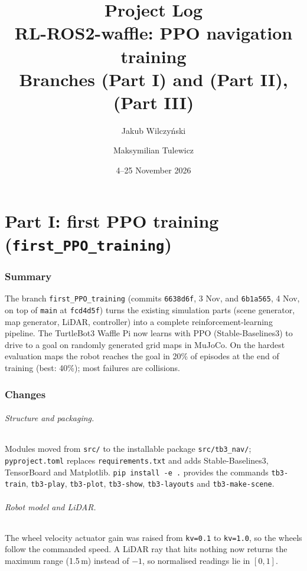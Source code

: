 \documentclass[11pt,a4paper]{article}
\title{\textbf{Project Log}\\[4pt]
\large RL-ROS2-waffle: PPO navigation training\\
\normalsize Branches \code{first\_PPO\_training} (Part I) and
\code{PPO\_evoution\_and\_tweaks} (Part II), \code{main} (Part III)}
\author{Jakub Wilczyński \and Maksymilian Tulewicz}
\date{4--25 November 2026}
\newcommand{\code}[1]{\texttt{#1}}
\begin{document}
\maketitle

\part*{Part I: first PPO training (\code{first\_PPO\_training})}

\section{Summary}
The branch \code{first\_PPO\_training} (commits \code{6638d6f}, 3 Nov, and
\code{6b1a565}, 4 Nov, on top of \code{main} at \code{fcd4d5f}) turns the
existing simulation parts (scene generator, map generator, LiDAR, controller)
into a complete reinforcement-learning pipeline. The TurtleBot3 Waffle Pi now
learns with PPO (Stable-Baselines3) to drive to a goal on randomly generated
grid maps in MuJoCo. On the hardest evaluation maps the robot reaches the goal
in 20\% of episodes at the end of training (best: 40\%); most failures are
collisions.

\section{Changes}

\paragraph{Structure and packaging.} Modules moved from \code{src/} to the installable package \code{src/tb3\_nav/};
\code{pyproject.toml} replaces \code{requirements.txt} and adds
Stable-Baselines3, TensorBoard and Matplotlib. \code{pip install -e .} provides
the commands \code{tb3-train}, \code{tb3-play}, \code{tb3-plot},
\code{tb3-show}, \code{tb3-layouts} and \code{tb3-make-scene}.

\paragraph{Robot model and LiDAR.} The wheel velocity actuator gain was raised from \code{kv=0.1} to
\code{kv=1.0}, so the wheels follow the commanded speed. A LiDAR ray that hits
nothing now returns the maximum range (1.5\,m) instead of $-1$, so normalised
readings lie in $[0,1]$.
\end{document}

